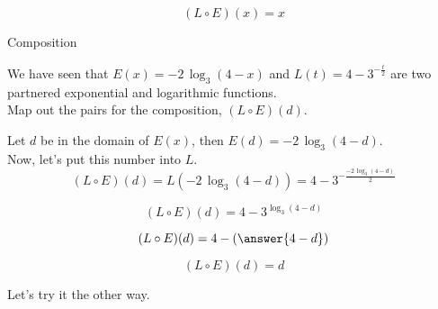 \documentclass{ximera}
\begin{document}
\[   (L \circ E)(x) = x        \]




\begin{example}  Composition

We have seen that $E(x) = -2 \, \log_3(4-x)$ and $L(t) = 4 - 3^{-\frac{t}{2}}$ are two partnered exponential and logarithmic functions. \\


Map out the pairs for the composition, $(L \circ E)(d)$.

\begin{explanation}


Let $d$ be in the domain of $E(x)$, then $E(d) = -2 \, \log_3(4-d)$. \\

Now, let's put this number into $L$. \\



\[    (L \circ E)(d)  =  L(-2 \, \log_3(4-d)) = 4 - 3^{-\frac{-2 \, \log_3(4-d)}{2}}              \]


\[    (L \circ E)(d)  =  4 - 3^{ \log_3(4-d)}              \]


\[    (L \circ E)(d)  =  4 - \left( \answer{4-d} \right)             \]


\[    (L \circ E)(d)  = d             \]

\end{explanation}
\end{example}




Let's try it the other way.
\end{document}
